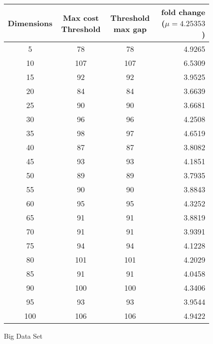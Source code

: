 \documentclass[a4paper,10pt]{article}
\begin{document}
\begin{figure}[h]
	\centering
	\begin{tabular}{|c|c|c|r|}
		\hline
		Dimensions & Max cost Threshold & Threshold max gap & fold change ($\mu = 4.25353$) \\\hline
		5 & 78 & 78 & 4.9265 \\\hline
		10 & 107 & 107 & 6.5309 \\\hline
		15 & 92 & 92 & 3.9525 \\\hline
		20 & 84 & 84 & 3.6639 \\\hline
		25 & 90 & 90 & 3.6681 \\\hline
		30 & 96 & 96 & 4.2508 \\\hline
		35 & 98 & 97 & 4.6519 \\\hline
		40 & 87 & 87 & 3.8082 \\\hline
		45 & 93 & 93 & 4.1851 \\\hline
		50 & 89 & 89 & 3.7935 \\\hline
		55 & 90 & 90 & 3.8843 \\\hline
		60 & 95 & 95 & 4.3252 \\\hline
		65 & 91 & 91 & 3.8819 \\\hline
		70 & 91 & 91 & 3.9391 \\\hline
		75 & 94 & 94 & 4.1228 \\\hline
		80 & 101 & 101 & 4.2029 \\\hline
		85 & 91 & 91 & 4.0458 \\\hline
		90 & 100 & 100 & 4.3406 \\\hline
		95 & 93 & 93 & 3.9544 \\\hline
		100 & 106 & 106 & 4.9422 \\\hline
	\end{tabular}
	\caption{Big Data Set}
\end{figure}
	
\end{document}
